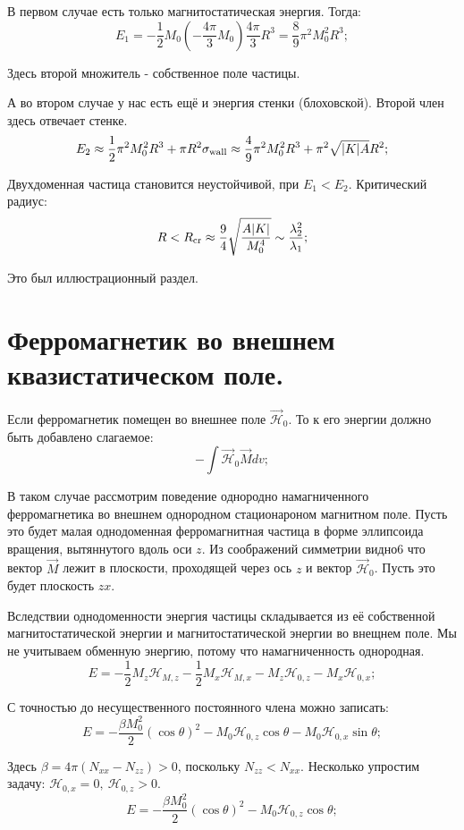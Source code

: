 \documentclass[a4paper, 14pt, russian]{article}
\newcommand{\be}{\begin{equation}}
\newcommand{\ee}{\end{equation}}
\begin{document}
	В первом случае есть только магнитостатическая энергия. Тогда:
	\be
		\label{eq170}
		E_1 = - \frac{1}{2} M_0 (- \frac{4\pi}{3} M_0) \frac{4\pi}{3} R^3 
			= \frac{8}{9} \pi^2 M_0^2 R^3;
	\ee

	Здесь второй множитель - собственное поле частицы.

	А во втором случае у нас есть ещё и энергия стенки (блоховской).
	Второй член здесь отвечает стенке.
	\be
		\label{eq171}
		E_2 \approx \frac{1}{2} \pi^2 M_0^2 R^3 + \pi R^2 \sigma_\text{wall}
			\approx \frac{4}{9} \pi^2 M_0^2 R^3 + \pi^2 \sqrt{\abs{K} A} R^2;
	\ee

	Двухдоменная частица становится неустойчивой, при $E_1 < E_2$.
	Критический радиус:
	\be
		\label{eq172}
		R < R_\text{cr} \approx \frac{9}{4} \sqrt{\frac{A \abs{K}}{M_0^4}}
			\sim \frac{\lambda_2^2}{\lambda_1};
	\ee

	Это был иллюстрационный раздел.

	\section{Ферромагнетик во внешнем квазистатическом поле.}

	Если ферромагнетик помещен во внешнее поле $\vec{\mathcal H}_0$. 
	То к его энергии должно быть добавлено слагаемое:
	\be
		\label{eq173}
		- \int \vec{\mathcal H}_0 \vec M dv;
	\ee

	В таком случае рассмотрим поведение однородно намагниченного ферромагнетика во внешнем
	однородном стационароном магнитном поле. Пусть это будет малая однодоменная
	ферромагнитная частица в форме эллипсоида вращения, вытяннутого вдоль оси $z$.
	Из соображений симметрии видно6 что вектор $\vec M$ лежит в плоскости, проходящей через
	ось $z$ и вектор $\vec{\mathcal H}_0$. Пусть это будет плоскость $zx$.

	Вследствии однодоменности энергия частицы складывается из её собственной магнитостатической
	энергии и магнитостатической энергии во внещнем поле. Мы не учитываем обменную энергию,
	потому что намагниченность однородная.
	\be
		\label{eq174}
		E = -\frac{1}{2} M_z {\mathcal H}_{M, z} - \frac{1}{2} M_x {\mathcal H}_{M, x}
			- M_z \mathcal{H}_{0,z} - M_x \mathcal{H}_{0,x};
	\ee

	С точностью до несущественного постоянного члена можно записать:
	\be
		\label{eq175}
		E = - \frac{\beta M_0^2}{2} (\cos \theta)^2 - M_0 \mathcal{H}_{0,z} \cos \theta
			- M_0 \mathcal{H}_{0,x} \sin \theta;
	\ee

	Здесь $\beta = 4\pi (N_{xx} - N_{zz}) > 0$, поскольку $N_{zz} < N_{xx}$.
	Несколько упростим задачу: $\mathcal{H}_{0,x} = 0,~ \mathcal{H}_{0,z} > 0$.
	\be
		E = - \frac{\beta M_0^2}{2} (\cos \theta)^2 - M_0 \mathcal{H}_{0,z} \cos \theta;
	\ee  
\end{document}
